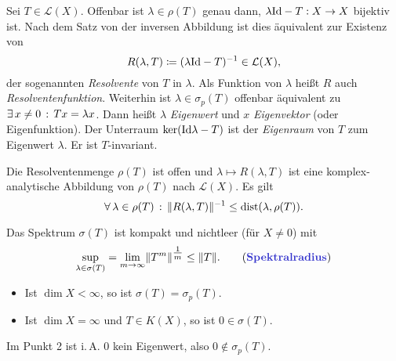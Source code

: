 \documentclass{cheat-sheet}
\newcommand{\LSO}{\mathcal{L}} %
\newcommand{\dist}{\mathrm{dist}} %
\begin{document}
\begin{bem}
  Sei $T \in \LSO(X)$. Offenbar ist $\lambda \in \rho(T)$ genau dann, $\lambda \mathrm{Id} - T : X \to X$ bijektiv ist. Nach dem Satz von der inversen Abbildung ist dies äquivalent zur Existenz von
  \[ R(\lambda, T) \coloneqq (\lambda \mathrm{Id} - T)^{-1} \in \mathcal{L}(X), \]
  der sogenannten \emph{Resolvente} von $T$ in $\lambda$. Als Funktion von $\lambda$ heißt $R$ auch \emph{Resolventenfunktion}. Weiterhin ist $\lambda \in \sigma_p(T)$ offenbar äquivalent zu $\exists \, {x \not= 0} \,:\, Tx = \lambda x$. Dann heißt $\lambda$ \emph{Eigenwert} und $x$ \emph{Eigenvektor} (oder Eigenfunktion). Der Unterraum $\ker(\mathrm{Id} \lambda - T)$ ist der \emph{Eigenraum} von $T$ zum Eigenwert $\lambda$. Er ist $T$-invariant.
\end{bem}

\begin{satz}
  Die Resolventenmenge $\rho(T)$ ist offen und $\lambda \mapsto R(\lambda, T)$ ist eine komplex-analytische Abbildung von $\rho(T)$ nach $\mathcal{L}(X)$. Es gilt
  \[ \fa{\lambda \in \rho(T)} \norm{R(\lambda, T)}^{-1} \leq \dist(\lambda, \rho(T)). \]
\end{satz}

\begin{satz}
  Das Spektrum $\sigma(T)$ ist kompakt und nichtleer (für $X {\not=} 0$) mit
  \[ \sup_{\lambda \in \sigma(T)} = \lim_{m \to \infty} \norm{T^m}^{\tfrac{1}{m}} \leq \norm{T}. \tag*{(\emph{Spektralradius})} \]
\end{satz}


\begin{lem}
  \begin{itemize}
    \item Ist $\dim X < \infty$, so ist $\sigma(T) = \sigma_p(T)$.
    \item Ist $\dim X = \infty$ und $T \in K(X)$, so ist $0 \in \sigma(T)$.
  \end{itemize}
\end{lem}

\begin{bem}
  Im Punkt 2 ist i.\,A. $0$ kein Eigenwert, also $0 \not\in \sigma_p(T)$.
\end{bem}

\end{document}
